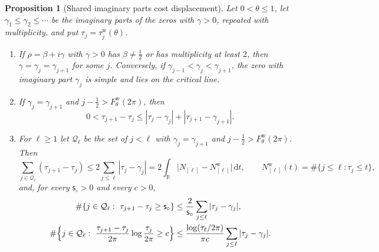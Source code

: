 \documentclass[11pt,a4paper]{article}
\numberwithin{equation}{section}
\newtheorem{proposition}[theorem]{Proposition}
\theoremstyle{definition}
\theoremstyle{remark}
\newcommand{\dd}{\,\mathrm dt}
\begin{document}
\begin{proposition}[Shared imaginary parts cost displacement]\label{prop:taucw-shared}
Let $0<\theta\le1$, let $\gamma_1\le\gamma_2\le\cdots$ be the imaginary parts of the zeros with $\gamma>0$, repeated with multiplicity, and put $\tau_j=\tau_j^{\mathrm w}(\theta)$.
\begin{enumerate}[label=(\alph*),leftmargin=*]
\item If $\rho=\beta+i\gamma$ with $\gamma>0$ has $\beta\ne\frac12$ or has multiplicity at least $2$, then $\gamma=\gamma_j=\gamma_{j+1}$ for some $j$. Conversely, if $\gamma_{j-1}<\gamma_j<\gamma_{j+1}$, the zero with imaginary part $\gamma_j$ is simple and lies on the critical line.
\item If $\gamma_j=\gamma_{j+1}$ and $j-\frac12>F^{\mathrm w}_\theta(2\pi)$, then
\begin{equation}\label{eq:taucw-shared}
0<\tau_{j+1}-\tau_j\le|\tau_j-\gamma_j|+|\tau_{j+1}-\gamma_{j+1}| .
\end{equation}
\item For $\ell\ge1$ let $\mathcal Q_\ell$ be the set of $j<\ell$ with $\gamma_j=\gamma_{j+1}$ and $j-\frac12>F^{\mathrm w}_\theta(2\pi)$. Then
\begin{equation}\label{eq:taucw-shared-sum}
\sum_{j\in\mathcal Q_\ell}(\tau_{j+1}-\tau_j)\le2\sum_{j\le\ell}|\tau_j-\gamma_j|=2\int_{\mathbb R}\bigl|N_{[\ell]}-N^{\mathrm w}_{[\ell]}\bigr|\dd,\qquad N^{\mathrm w}_{[\ell]}(t)=\#\{j\le\ell:\tau_j\le t\},
\end{equation}
and, for every $\mathsf s_\circ>0$ and every $c>0$,
\begin{align}
\#\{j\in\mathcal Q_\ell:\ \tau_{j+1}-\tau_j\ge\mathsf s_\circ\}&\le\frac2{\mathsf s_\circ}\sum_{j\le\ell}|\tau_j-\gamma_j|,\label{eq:taucw-shared-count}\\
\#\Bigl\{j\in\mathcal Q_\ell:\ \frac{\tau_{j+1}-\tau_j}{2\pi}\log\frac{\tau_j}{2\pi}\ge c\Bigr\}&\le\frac{\log(\tau_\ell/2\pi)}{\pi c}\sum_{j\le\ell}|\tau_j-\gamma_j| .\label{eq:taucw-shared-count2}
\end{align}
\end{enumerate}
\end{proposition}
\end{document}
